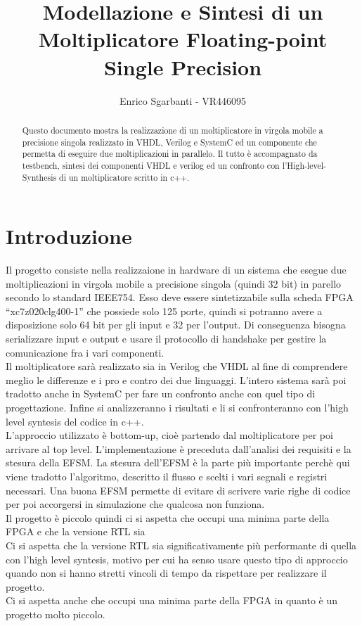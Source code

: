 \documentclass[]{IEEEtran}
\title{Modellazione e Sintesi di un Moltiplicatore Floating-point Single Precision}
\author{Enrico Sgarbanti - VR446095}
\begin{document}
\maketitle


\begin{abstract}
    Questo documento mostra la realizzazione di un moltiplicatore in virgola mobile a precisione singola realizzato in VHDL, Verilog e SystemC ed un componente che permetta di eseguire due moltiplicazioni in parallelo. Il tutto è accompagnato da testbench, sintesi dei componenti VHDL e verilog ed un confronto con l'High-level-Synthesis di un moltiplicatore scritto in c++.
\end{abstract}


\section{Introduzione}
Il progetto consiste nella realizzaione in hardware di un sistema che esegue due moltiplicazioni in virgola mobile a precisione singola (quindi 32 bit) in parello secondo lo standard IEEE754. Esso deve essere sintetizzabile sulla scheda FPGA ``xc7z020clg400-1'' che possiede solo 125 porte, quindi si potranno avere a disposizione solo 64 bit per gli input e 32 per l'output. Di conseguenza bisogna serializzare input e output e usare il protocollo di handshake per gestire la comunicazione fra i vari componenti.
\\Il moltiplicatore sarà realizzato sia in Verilog che VHDL al fine di comprendere meglio le differenze e i pro e contro dei due linguaggi. L'intero sistema sarà poi tradotto anche in SystemC per fare un confronto anche con quel tipo di progettazione. Infine si analizzeranno i risultati e li si confronteranno con l'high level syntesis del codice in c++.
\\L'approccio utilizzato è bottom-up, cioè partendo dal moltiplicatore per poi arrivare al top level. L'implementazione è preceduta dall'analisi dei requisiti e la stesura della EFSM. La stesura dell'EFSM è la parte più importante perchè qui viene tradotto l'algoritmo, descritto il flusso e scelti i vari segnali e registri necessari. Una buona EFSM permette di evitare di scrivere varie righe di codice per poi accorgersi in simulazione che qualcosa non funziona.
\\Il progetto è piccolo quindi ci si aspetta che occupi una minima parte della FPGA e che la versione RTL sia 
\\Ci si aspetta che la versione RTL sia significativamente più performante di quella con l'high level syntesis, motivo per cui ha senso usare questo tipo di approccio quando non si hanno stretti vincoli di tempo da rispettare per realizzare il progetto.
\\Ci si aspetta anche che occupi una minima parte della FPGA in quanto è un progetto molto piccolo.
\end{document}
